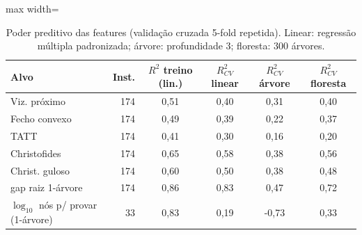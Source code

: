 \begin{table}[htb]
\centering
\caption{Poder preditivo das features (validação cruzada 5-fold repetida). Linear: regressão múltipla padronizada; árvore: profundidade 3; floresta: 300 árvores.}
\label{tab:modelos}
\small
\begin{adjustbox}{max width=\linewidth}
\begin{tabular}{lrcccc}
\toprule
Alvo & Inst. & $R^2$ treino (lin.) & $R^2_{CV}$ linear & $R^2_{CV}$ árvore & $R^2_{CV}$ floresta \\
\midrule
Viz. próximo & 174 & 0{,}51 & 0{,}40 & 0{,}31 & 0{,}40 \\
Fecho convexo & 174 & 0{,}49 & 0{,}39 & 0{,}22 & 0{,}37 \\
TATT & 174 & 0{,}41 & 0{,}30 & 0{,}16 & 0{,}20 \\
Christofides & 174 & 0{,}65 & 0{,}58 & 0{,}38 & 0{,}56 \\
Christ. guloso & 174 & 0{,}60 & 0{,}50 & 0{,}38 & 0{,}48 \\
gap raiz 1-árvore & 174 & 0{,}86 & 0{,}83 & 0{,}47 & 0{,}72 \\
$\log_{10}$ nós p/ provar (1-árvore) & 33 & 0{,}83 & 0{,}19 & -0{,}73 & 0{,}33 \\
\bottomrule
\end{tabular}
\end{adjustbox}
\end{table}
